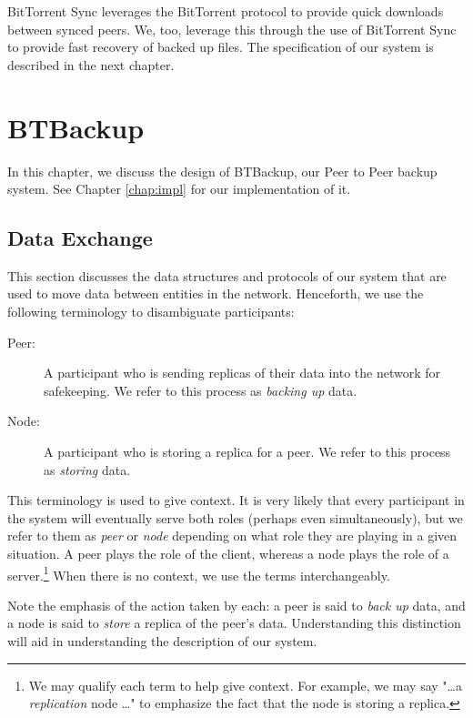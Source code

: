 \documentclass[12pt]{report}
\begin{document}
BitTorrent Sync leverages the BitTorrent protocol to provide quick downloads between synced peers. We, too, leverage this through the use of BitTorrent Sync to provide fast recovery of backed up files. The specification of our system is described in the next chapter.

\chapter{BTBackup} \label{chap:BTBackup}

In this chapter, we discuss the design of BTBackup, our Peer to Peer backup system. See Chapter \ref{chap:impl} for our implementation of it.

\section{Data Exchange} \label{sec:DataExchange}

This section discusses the data structures and protocols of our system that are used to move data between entities in the network. Henceforth, we use the following terminology to disambiguate participants:

\begin{description}
  \item[Peer:] A participant who is sending replicas of their data into the network for safekeeping. We refer to this process as \textit{backing up} data.
  \item[Node:] A participant who is storing a replica for a peer. We refer to this process as \textit{storing} data.
\end{description}

This terminology is used to give context. It is very likely that every participant in the system will eventually serve both roles (perhaps even simultaneously), but we refer to them as \textit{peer} or \textit{node} depending on what role they are playing in a given situation. A peer plays the role of the client, whereas a node plays the role of a server.\footnote{We may qualify each term to help give context. For example, we may say "\ldots a \textit{replication} node \ldots" to emphasize the fact that the node is storing a replica.} When there is no context, we use the terms interchangeably.

Note the emphasis of the action taken by each: a peer is said to \textit{back up} data, and a node is said to \textit{store} a replica of the peer's data. Understanding this distinction will aid in understanding the description of our system.
\end{document}
